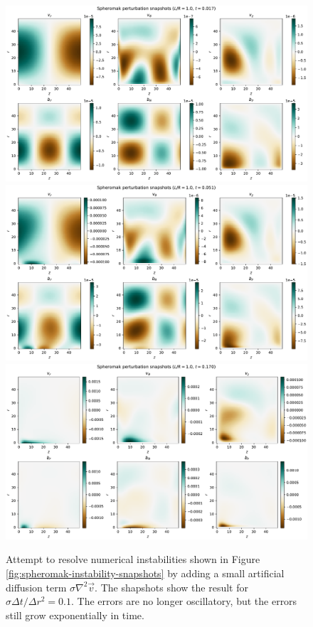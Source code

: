\documentclass[%
 reprint,
 amsmath,amssymb,
 aps,
]{revtex4-2}
\begin{document}
\begin{figure}[H]
\includegraphics[width=0.9\linewidth]{proj2-3/spheromak_snapshot_diffusion_1.pdf}
\includegraphics[width=0.9\linewidth]{proj2-3/spheromak_snapshot_diffusion_3.pdf}
\includegraphics[width=0.9\linewidth]{proj2-3/spheromak_snapshot_diffusion_10.pdf}
\caption{\label{fig:spheromak-instability-snapshots-diffusion}Attempt to resolve numerical instabilities shown in Figure \ref{fig:spheromak-instability-snapshots} by adding a small artificial diffusion term $\sigma \nabla ^2 \vec v$. The shapshots show the result for $\sigma \Delta t / \Delta r ^2 = 0.1$. The errors are no longer oscillatory, but the errors still grow exponentially in time.}
\end{figure}
\end{document}
